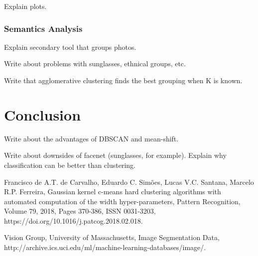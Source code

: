 \documentclass[conference]{IEEEtran}
\begin{document}
Explain plots.

\subsubsection{Semantics Analysis}

Explain secondary tool that groups photos.

Write about problems with sunglasses, ethnical groups, etc.

Write that agglomerative clustering finds the best grouping when K is known.

\section{Conclusion}

Write about the advantages of DBSCAN and mean-shift.

Write about downsides of facenet (sunglasses, for example).
Explain why classification can be better than clustering.

\begin{thebibliography}{00}
 Francisco de A.T. de Carvalho, Eduardo C. Simões, Lucas V.C. Santana, Marcelo R.P. Ferreira,
Gaussian kernel c-means hard clustering algorithms with automated computation of the width hyper-parameters,
Pattern Recognition,
Volume 79,
2018,
Pages 370-386,
ISSN 0031-3203,
https://doi.org/10.1016/j.patcog.2018.02.018.

 Vision Group, University of Massachusetts, 
Image Segmentation Data,
http://archive.ics.uci.edu/ml/machine-learning-databases/image/.

\end{thebibliography}
\end{document}
